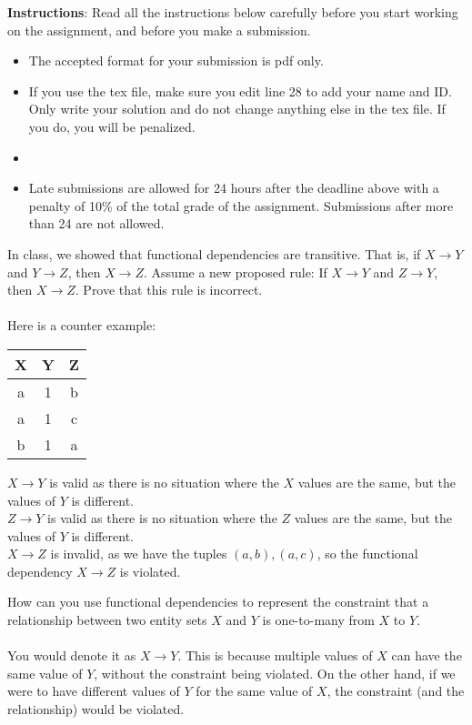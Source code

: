 \documentclass[a4 paper]{article}
\begin{document}
\textbf{Instructions}: Read all the instructions below carefully before you start working on the assignment, and before you make a submission.
\begin{itemize}
    \item The accepted format for your submission is pdf only.
    \item If you use the tex file, make sure you edit line 28 to add your name and ID. Only write your solution and do not change anything else in the tex file. If you do, you will be penalized.
    \item \item Late submissions are allowed for 24 hours after the deadline above with a penalty of 10\% of the total grade of the assignment. Submissions after more than 24 are not allowed.
\end{itemize}

In class, we showed that functional dependencies are transitive. That is, if $X \rightarrow Y$ and $Y \rightarrow Z$, then $X \rightarrow Z$. Assume a new proposed rule: If $X \rightarrow Y$ and $Z \rightarrow Y$, then $X \rightarrow Z$. Prove that this rule is incorrect.\\\\
Here is a counter example:
\begin{center}
  \begin{tabular}{|c|c|c|}
   \hline
    X & Y & Z\\ [0.5ex]
   \hline\hline
   a & 1 & b\\
   \hline
   a & 1 & c\\
   \hline
   b & 1 & a\\
   \hline
  \end{tabular}
\end{center}
$X\rightarrow Y$ is valid as there is no situation where the $X$ values are the same, but the values of $Y$ is different.\\
$Z\rightarrow Y$ is valid as there is no situation where the $Z$ values are the same, but the values of $Y$ is different.\\
$X\rightarrow Z$ is invalid, as we have the tuples $(a,b),(a,c)$, so the functional dependency $X\rightarrow Z$ is violated.



How can you use functional dependencies to represent the constraint that a relationship between two entity sets $X$ and $Y$ is one-to-many from $X$ to $Y$.\\\\
You would denote it as $X\rightarrow Y$. This is because multiple values of $X$ can have the same value of $Y$, without the constraint being violated. On the other hand, if we were to have different values of $Y$ for the same value of $X$, the constraint (and the relationship) would be violated.
\end{document}
